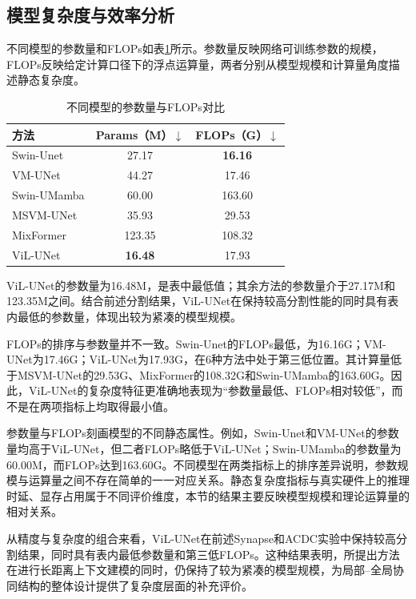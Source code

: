 
\subsection{模型复杂度与效率分析}

不同模型的参数量和FLOPs如表\ref{tab:ch3-complexity}所示。参数量反映网络可训练参数的规模，FLOPs反映给定计算口径下的浮点运算量，两者分别从模型规模和计算量角度描述静态复杂度。

\begin{table}[htbp]
  \centering
  \caption{不同模型的参数量与FLOPs对比}
  \label{tab:ch3-complexity}
  \begin{tabular}{lcc}
    \hline
    方法 & Params（M）$\downarrow$ & FLOPs（G）$\downarrow$ \\
    \hline
    Swin-Unet   & 27.17  & \textbf{16.16} \\
    VM-UNet     & 44.27  & 17.46 \\
    Swin-UMamba & 60.00  & 163.60 \\
    MSVM-UNet   & 35.93  & 29.53 \\
    MixFormer   & 123.35 & 108.32 \\
    ViL-UNet    & \textbf{16.48} & 17.93 \\
    \hline
  \end{tabular}
\end{table}

ViL-UNet的参数量为16.48M，是表中最低值；其余方法的参数量介于27.17M和123.35M之间。结合前述分割结果，ViL-UNet在保持较高分割性能的同时具有表内最低的参数量，体现出较为紧凑的模型规模。

FLOPs的排序与参数量并不一致。Swin-Unet的FLOPs最低，为16.16G；VM-UNet为17.46G；ViL-UNet为17.93G，在6种方法中处于第三低位置。其计算量低于MSVM-UNet的29.53G、MixFormer的108.32G和Swin-UMamba的163.60G。因此，ViL-UNet的复杂度特征更准确地表现为“参数量最低、FLOPs相对较低”，而不是在两项指标上均取得最小值。

参数量与FLOPs刻画模型的不同静态属性。例如，Swin-Unet和VM-UNet的参数量均高于ViL-UNet，但二者FLOPs略低于ViL-UNet；Swin-UMamba的参数量为60.00M，而FLOPs达到163.60G。不同模型在两类指标上的排序差异说明，参数规模与运算量之间不存在简单的一一对应关系。静态复杂度指标与真实硬件上的推理时延、显存占用属于不同评价维度，本节的结果主要反映模型规模和理论运算量的相对关系。

从精度与复杂度的组合来看，ViL-UNet在前述Synapse和ACDC实验中保持较高分割结果，同时具有表内最低参数量和第三低FLOPs。这种结果表明，所提出方法在进行长距离上下文建模的同时，仍保持了较为紧凑的模型规模，为局部--全局协同结构的整体设计提供了复杂度层面的补充评价。

